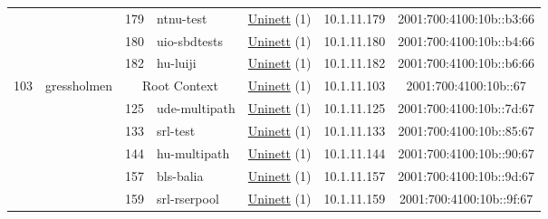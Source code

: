 \begin{small}
\begin{center}
\begin{longtable}{|c|c|c|c|c|c|c|c|}
  &  & \tiny{179} & \multicolumn{1}{|l|}{\tiny{ntnu-test}} & \multicolumn{2}{|c|}{\tiny{\href{https://www.uninett.no}{Uninett} (1)}} & \tiny{10.1.11.179} & \tiny{2001:700:4100:10b::b3:66} \\* \cline{3-3}\cline{4-4}\cline{5-5}\cline{6-6}\cline{7-7}\cline{8-8}
  &  & \tiny{180} & \multicolumn{1}{|l|}{\tiny{uio-sbdtests}} & \multicolumn{2}{|c|}{\tiny{\href{https://www.uninett.no}{Uninett} (1)}} & \tiny{10.1.11.180} & \tiny{2001:700:4100:10b::b4:66} \\* \cline{3-3}\cline{4-4}\cline{5-5}\cline{6-6}\cline{7-7}\cline{8-8}
  &  & \tiny{182} & \multicolumn{1}{|l|}{\tiny{hu-luiji}} & \multicolumn{2}{|c|}{\tiny{\href{https://www.uninett.no}{Uninett} (1)}} & \tiny{10.1.11.182} & \tiny{2001:700:4100:10b::b6:66} \\ \hline
 \multirow{10}{*}{\tiny{103}} & \multicolumn{1}{|l|}{\multirow{10}{*}{\tiny{gressholmen}}} & \multicolumn{2}{|c|}{\tiny{Root Context}} & \multicolumn{2}{|c|}{\tiny{\href{https://www.uninett.no}{Uninett} (1)}} & \tiny{10.1.11.103} & \tiny{2001:700:4100:10b::67} \\* \cline{3-3}\cline{4-4}\cline{5-5}\cline{6-6}\cline{7-7}\cline{8-8}
  &  & \tiny{125} & \multicolumn{1}{|l|}{\tiny{ude-multipath}} & \multicolumn{2}{|c|}{\tiny{\href{https://www.uninett.no}{Uninett} (1)}} & \tiny{10.1.11.125} & \tiny{2001:700:4100:10b::7d:67} \\* \cline{3-3}\cline{4-4}\cline{5-5}\cline{6-6}\cline{7-7}\cline{8-8}
  &  & \tiny{133} & \multicolumn{1}{|l|}{\tiny{srl-test}} & \multicolumn{2}{|c|}{\tiny{\href{https://www.uninett.no}{Uninett} (1)}} & \tiny{10.1.11.133} & \tiny{2001:700:4100:10b::85:67} \\* \cline{3-3}\cline{4-4}\cline{5-5}\cline{6-6}\cline{7-7}\cline{8-8}
  &  & \tiny{144} & \multicolumn{1}{|l|}{\tiny{hu-multipath}} & \multicolumn{2}{|c|}{\tiny{\href{https://www.uninett.no}{Uninett} (1)}} & \tiny{10.1.11.144} & \tiny{2001:700:4100:10b::90:67} \\* \cline{3-3}\cline{4-4}\cline{5-5}\cline{6-6}\cline{7-7}\cline{8-8}
  &  & \tiny{157} & \multicolumn{1}{|l|}{\tiny{bls-balia}} & \multicolumn{2}{|c|}{\tiny{\href{https://www.uninett.no}{Uninett} (1)}} & \tiny{10.1.11.157} & \tiny{2001:700:4100:10b::9d:67} \\* \cline{3-3}\cline{4-4}\cline{5-5}\cline{6-6}\cline{7-7}\cline{8-8}
  &  & \tiny{159} & \multicolumn{1}{|l|}{\tiny{srl-rserpool}} & \multicolumn{2}{|c|}{\tiny{\href{https://www.uninett.no}{Uninett} (1)}} & \tiny{10.1.11.159} & \tiny{2001:700:4100:10b::9f:67} \\* \cline{3-3}\cline{4-4}\cline{5-5}\cline{6-6}\cline{7-7}\cline{8-8}

\end{longtable}
\end{center}
\end{small}

